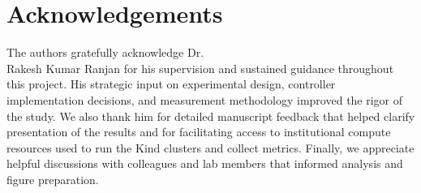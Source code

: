 \documentclass[twocolumn]{svjour3}
\begin{document}
\section*{Acknowledgements}
The authors gratefully acknowledge Dr.\\ Rakesh Kumar Ranjan for his supervision and sustained guidance throughout this project. His strategic input on experimental design, controller implementation decisions, and measurement methodology improved the rigor of the study. We also thank him for detailed manuscript feedback that helped clarify presentation of the results and for facilitating access to institutional compute resources used to run the Kind clusters and collect metrics. Finally, we appreciate helpful discussions with colleagues and lab members that informed analysis and figure preparation.




\end{document}
